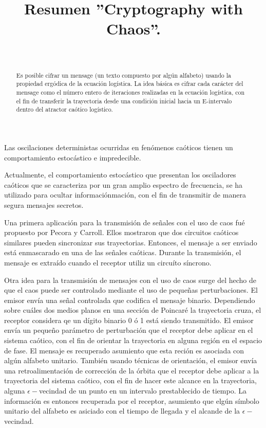 \documentclass[10pt]{IEEEtran}
\title {Resumen ''Cryptography with Chaos''.}
\author{\IEEEauthorblockN{Marcos Daniel Calderón Calderón}\\
\IEEEauthorblockA{Maestría en Ciencias de la Computación\\
Centro de Investigación en Matemáticas (CIMAT)\\
Guanajuato , Gto.\\
marcos.calderon@cimat.mx}}
\begin{document}
\maketitle
\begin{abstract}
Es posible cifrar un mensage (un texto compuesto por algún alfabeto) usando la propiedad ergódica de la ecuación logística. La idea básica es cifrar cada carácter del mensage como el número entero de iteraciones realizadas en la ecuación logística, con el fin de transferir la trayectoria desde una condición inicial hacia un E-intervalo dentro del atractor caótico logístico.
\end{abstract}


Las oscilaciones deterministas ocurridas en fenómenos caóticos tienen un comportamiento estocástico e impredecible.

Actualmente, el comportamiento estocástico que presentan los osciladores caóticos que se caracteriza por un gran amplio espectro de frecuencia, se ha utilizado para ocultar informaciónmación, con el fin de transmitir de manera segura mensajes secretos. 

Una primera aplicación para la transmisión de señales con el uso de caos fué propuesto por Pecora y Carroll. Ellos mostraron que dos circuitos caóticos similares pueden sincronizar sus trayectorias. Entonces, el mensaje a ser enviado está enmascarado en una de las señales caóticas. Durante la transmisión, el mensaje es extraído cuando el receptor utiliz un circuíto síncrono.

Otra idea para la transmisión de mensajes con el uso de caos surge del hecho de que el caos puede ser controlado mediante el uso de pequeñas perturbaciones. El emisor envía una señal controlada que  codifica el mensaje binario. Dependiendo sobre cuáles dos medios planos en una sección de Poincaré la trayectoria cruza, el receptor considera qe un dígito binario 0 ó 1 está siendo transmitido. El emisor envía un pequeño parámetro de perturbación que el receptor debe aplicar en el sistema caótico, con el fin de orientar la trayectoria en alguna región en el espacio de fase. El mensaje es recuperado asumiento que esta reción es asociada con algún alfabeto unitario. También usando técnicas de orientación, el emisor envía una retroalimentación  de corrección de la órbita que el receptor debe aplicar a la trayectoria del sistema caótico, con el fin de hacer este alcance en la trayectoria, alguna $\epsilon-$vecindad de un punto en un intervalo prestablecido de tiempo. La información es entonces recuperada por el receptor, asumiento que elgún símbolo unitario del alfabeto es asiciado con el tiempo de llegada y el alcande de la $\epsilon-$vecindad.
\end{document}
